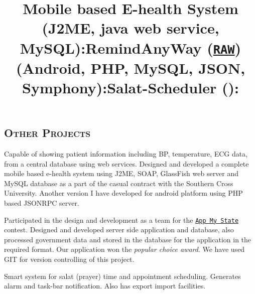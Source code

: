 \begin{resume}
\section{\textsc{Other Projects}}

\title{\textbf{Mobile based E-health System (J2ME, java web service, MySQL):}}
\begin{position}
Capable of showing patient information including BP, temperature, ECG data, from a central database using web services. Designed and developed a complete mobile based e-health system using J2ME, SOAP, GlassFish web server and MySQL database as a part of the casual contract with the Southern Cross University. Another version I have developed for android platform using PHP based JSONRPC server. 
\end{position}

\title{\textbf{RemindAnyWay (\href{http://www.remindanyway.com/}{\tt RAW}) (Android, PHP, MySQL, JSON, Symphony):}}
\begin{position}
Participated in the design and development as a team for the \href{http://www.egov.vic.gov.au/victorian-government-resources/government-initiatives-victoria/government-and-politics-victoria/government-information-and-data-victoria/victoria-launches-app-my-state-competition-with-100-000-in-prizes.html}{\tt App My State} contest. Designed and developed server side application and database, also processed government data and stored in the database for the application in the required format. Our application won the \textit{popular choice award}. We have used GIT for version controlling of this project.
\end{position}


\title{\textbf{Salat-Scheduler (\BCSharp):}}
\begin{position}
Smart system for salat (prayer) time and appointment scheduling. Generates alarm and task-bar notification. Also has export import facilities. 
\end{position}


\end{resume}
